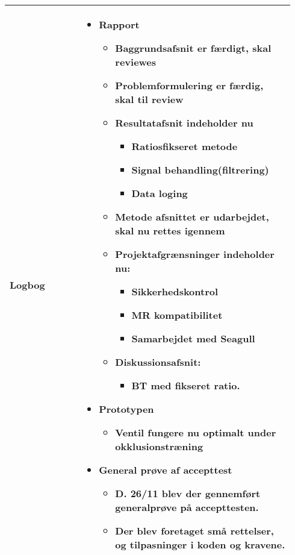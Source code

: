 \begin{longtable}{|p{0.24\linewidth}|p{0.7\linewidth}|}
		\\ \hline
		Logbog & 
		\begin{itemize}
			\item Rapport
			\begin{itemize}
				\item Baggrundsafsnit er færdigt, skal reviewes
				\item Problemformulering er færdig, skal til review
				\item Resultatafsnit indeholder nu
				\begin{itemize}
					\item Ratiosfikseret metode 
					\item Signal behandling(filtrering)
					\item Data loging 
				\end{itemize}
				\item Metode afsnittet er udarbejdet, skal nu rettes igennem
				\item Projektafgrænsninger indeholder nu: 
				\begin{itemize}
					\item Sikkerhedskontrol 
					\item MR kompatibilitet 
					\item Samarbejdet med Seagull
				\end{itemize}
				\item Diskussionsafsnit:
				\begin{itemize}
					\item BT med fikseret ratio. 
				\end{itemize}
			\end{itemize}
			\item Prototypen
			\begin{itemize}
				\item Ventil fungere nu optimalt under okklusionstræning
			\end{itemize}
			\item General prøve af accepttest
			\begin{itemize}
				\item D. 26/11 blev der gennemført generalprøve på accepttesten. 
				\item Der blev foretaget små rettelser, og tilpasninger i koden og kravene.
			\end{itemize}
		\end{itemize}
		\\ \hline
	\end{longtable}
	
